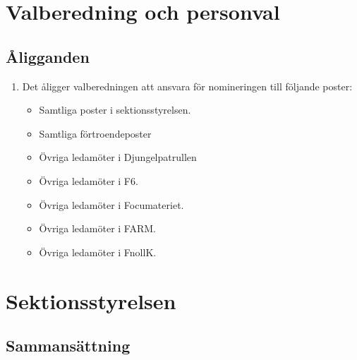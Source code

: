 \documentclass[11pt,a4paper]{article}
\begin{document}
\newpage

\section{Valberedning och personval}

\subsection{Åligganden}

\begin{enumerate}[\thesubsection .1]

  \item Det åligger valberedningen att ansvara för nomineringen till
  följande poster:
    \begin{itemize}
      \item Samtliga poster i sektionsstyrelsen.
      \item Samtliga förtroendeposter
      \item Övriga ledamöter i Djungelpatrullen
      \item Övriga ledamöter i F6.
      \item Övriga ledamöter i Focumateriet.
        \item Övriga ledamöter i FARM.
          \item Övriga ledamöter i FnollK. 
        
    \end{itemize}

\end{enumerate}

\newpage

\section{Sektionsstyrelsen}

\subsection{Sammansättning}
\end{document}
